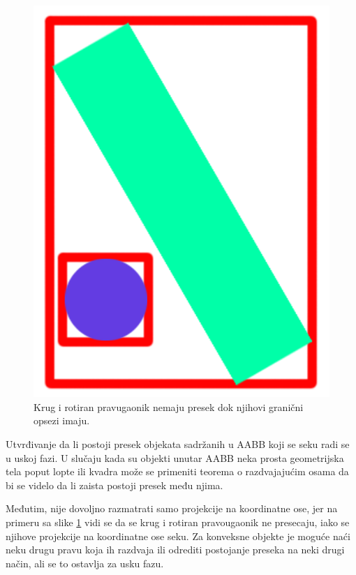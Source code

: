 \documentclass[12pt,oneside]{memoir}
\begin{document}
\begin{figure}[h!]
	\begin{center}
	\includegraphics[scale=0.2]{2dfalseCol.png}
	\end{center}
	\caption{Krug i rotiran pravugaonik nemaju presek dok njihovi granični opsezi imaju.}
	\label{fig:2dfalse}
\end{figure}

Utvrđivanje da li postoji presek objekata sadržanih u AABB koji se seku radi se u uskoj fazi.
U slučaju kada su objekti unutar AABB neka prosta geometrijska tela poput
lopte ili kvadra može se primeniti teorema o razdvajajućim osama da bi se videlo da li zaista postoji presek među njima. 


Međutim, nije dovoljno razmatrati samo projekcije na koordinatne ose, 
jer na primeru sa slike \ref{fig:2dfalse} vidi se da se krug i rotiran pravougaonik ne presecaju, iako se njihove projekcije 
na koordinatne ose seku. Za konveksne objekte je moguće naći neku drugu pravu koja ih razdvaja ili odrediti postojanje preseka 
na neki drugi način, ali se to ostavlja za usku fazu.
\end{document}
